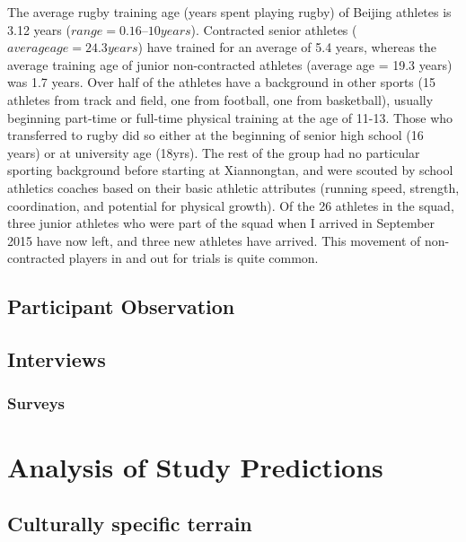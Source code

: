 The average rugby training age (years spent playing rugby) of Beijing athletes is 3.12 years ($range = 0.16 – 10 years$).  Contracted senior athletes ($average age = 24.3 years$) have trained for an average of 5.4 years, whereas the average training age of junior non-contracted athletes (average age = 19.3 years) was 1.7 years.  Over half of the athletes have a background in other sports (15 athletes from track and field, one from football, one from basketball), usually beginning part-time or full-time physical training at the age of 11-13.  Those who transferred to rugby did so either at the beginning of senior high school (16 years) or at university age (18yrs).  The rest of the group had no particular sporting background before starting at Xiannongtan, and were scouted by school athletics coaches based on their basic athletic attributes (running speed, strength, coordination, and potential for physical growth).  Of the 26 athletes in the squad, three junior athletes who were part of the squad when I arrived in September 2015 have now left, and three new athletes have arrived. This movement of non-contracted players in and out for trials is quite common.



      \subsection{Participant Observation}


      \subsection{Interviews}


      \subsubsection{Surveys}


\section{Analysis of Study Predictions}


  \subsection{Culturally specific terrain}

